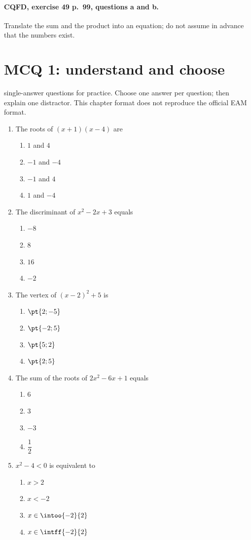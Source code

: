 \paragraph{CQFD, exercise 49 p.~99, questions a and b.}\label{C02-M2} Translate the sum and the product into an equation; do not assume in advance that the numbers exist.
\begingroup\small
\mxnewpage\section*{MCQ 1: understand and choose}\label{C02-Q1}
 single-answer questions for practice. Choose one answer per question; then explain one distractor. This chapter format does not reproduce the official EAM format.
\begin{enumerate}
\item The roots of $(x+1)(x-4)$ are
\begin{enumerate}[label=\Alph*.,itemsep=2pt]
\item $1$ and $4$
\item $-1$ and $-4$
\item $-1$ and $4$
\item $1$ and $-4$
\end{enumerate}
\item The discriminant of $x^2-2x+3$ equals
\begin{enumerate}[label=\Alph*.,itemsep=2pt]
\item $-8$
\item $8$
\item $16$
\item $-2$
\end{enumerate}
\item The vertex of $(x-2)^2+5$ is
\begin{enumerate}[label=\Alph*.,itemsep=2pt]
\item $\pt{2;-5}$
\item $\pt{-2;5}$
\item $\pt{5;2}$
\item $\pt{2;5}$
\end{enumerate}
\item The sum of the roots of $2x^2-6x+1$ equals
\begin{enumerate}[label=\Alph*.,itemsep=2pt]
\item $6$
\item $3$
\item $-3$
\item $\dfrac{1}{2}$
\end{enumerate}
\item $x^2-4<0$ is equivalent to
\begin{enumerate}[label=\Alph*.,itemsep=2pt]
\item $x>2$
\item $x<-2$
\item $x\in\intoo{-2}{2}$
\item $x\in\intff{-2}{2}$
\end{enumerate}
\end{enumerate}
